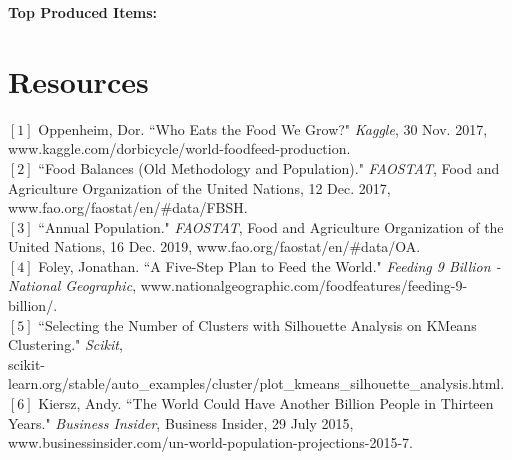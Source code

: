 \documentclass[12pt, a4paper]{article}
\begin{document}
\begin{spacing}{1.1}

	\noindent \textbf{Top Produced Items:}\\

	
	
	\newpage
	
	
	
	
	
	
	
	
	
	
	\newpage
	

	\section{Resources}
	$[1]$ Oppenheim, Dor. ``Who Eats the Food We Grow?" \textit{Kaggle}, 30 Nov. 2017, \\ \hspace*{5mm} www.kaggle.com/dorbicycle/world-foodfeed-production. \vspace*{2.5mm}\\
	$[2]$ ``Food Balances (Old Methodology and Population)." \textit{FAOSTAT}, Food and \\ \hspace*{5mm} Agriculture Organization of the United Nations, 12 Dec. 2017, \\ \hspace*{5mm} www.fao.org/faostat/en/\#data/FBSH. \vspace*{2.5mm}\\
	$[3]$ ``Annual Population." \textit{FAOSTAT}, Food and Agriculture Organization of the \\ \hspace*{5mm} United Nations, 16 Dec. 2019, www.fao.org/faostat/en/\#data/OA. \vspace*{2.5mm}\\
	$[4]$ Foley, Jonathan. ``A Five-Step Plan to Feed the World." \textit{Feeding 9 Billion - \\ \hspace*{5mm} National Geographic}, www.nationalgeographic.com/foodfeatures/feeding-9-billion/.\vspace*{2.5mm}\\
	$[5]$ ``Selecting the Number of Clusters with Silhouette Analysis on KMeans \\ \hspace*{5mm} Clustering." \textit{Scikit}, 
	\\ \hspace*{6mm} scikit-learn.org/stable/auto\_examples/cluster/plot\_kmeans\_silhouette\_analysis.html.\vspace*{2.5mm}\\
	$[6]$ Kiersz, Andy. ``The World Could Have Another Billion People in Thirteen \\\hspace*{6mm}Years." \textit{Business Insider}, Business Insider, 29 July 2015,\\\hspace*{6mm}www.businessinsider.com/un-world-population-projections-2015-7. \vspace*{2.5mm}\\
	


\end{spacing}
\end{document}
